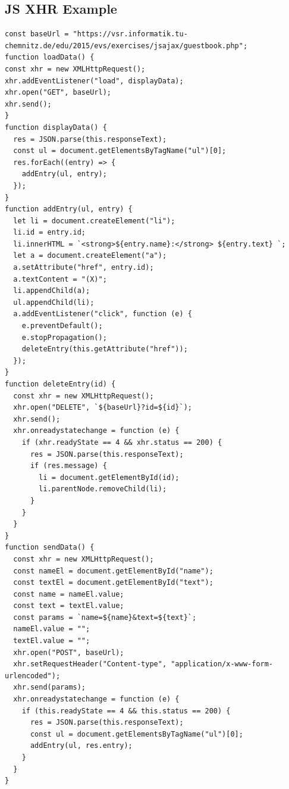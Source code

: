 \documentclass[11pt]{article}
\begin{document}
\subsection{JS XHR Example}
\label{sec:orgc71ec6b}
\lstset{breaklines=true,language=javascript,label= ,caption= ,captionpos=b,numbers=none}
\begin{lstlisting}
const baseUrl = "https://vsr.informatik.tu-chemnitz.de/edu/2015/evs/exercises/jsajax/guestbook.php";
function loadData() {
const xhr = new XMLHttpRequest();
xhr.addEventListener("load", displayData);
xhr.open("GET", baseUrl);
xhr.send();
}
function displayData() {
  res = JSON.parse(this.responseText);
  const ul = document.getElementsByTagName("ul")[0];
  res.forEach((entry) => {
    addEntry(ul, entry);
  });
}
function addEntry(ul, entry) {
  let li = document.createElement("li");
  li.id = entry.id;
  li.innerHTML = `<strong>${entry.name}:</strong> ${entry.text} `;
  let a = document.createElement("a");
  a.setAttribute("href", entry.id);
  a.textContent = "(X)";
  li.appendChild(a);
  ul.appendChild(li);
  a.addEventListener("click", function (e) {
    e.preventDefault();
    e.stopPropagation();
    deleteEntry(this.getAttribute("href"));
  });
}
function deleteEntry(id) {
  const xhr = new XMLHttpRequest();
  xhr.open("DELETE", `${baseUrl}?id=${id}`);
  xhr.send();
  xhr.onreadystatechange = function (e) {
    if (xhr.readyState == 4 && xhr.status == 200) {
      res = JSON.parse(this.responseText);
      if (res.message) {
        li = document.getElementById(id);
        li.parentNode.removeChild(li);
      }
    }
  }
}
function sendData() {
  const xhr = new XMLHttpRequest();
  const nameEl = document.getElementById("name");
  const textEl = document.getElementById("text");
  const name = nameEl.value;
  const text = textEl.value;
  const params = `name=${name}&text=${text}`;
  nameEl.value = "";
  textEl.value = "";
  xhr.open("POST", baseUrl);
  xhr.setRequestHeader("Content-type", "application/x-www-form-urlencoded");
  xhr.send(params);
  xhr.onreadystatechange = function (e) {
    if (this.readyState == 4 && this.status == 200) {
      res = JSON.parse(this.responseText);
      const ul = document.getElementsByTagName("ul")[0];
      addEntry(ul, res.entry);
    }
  }
}
\end{lstlisting}
\end{document}
